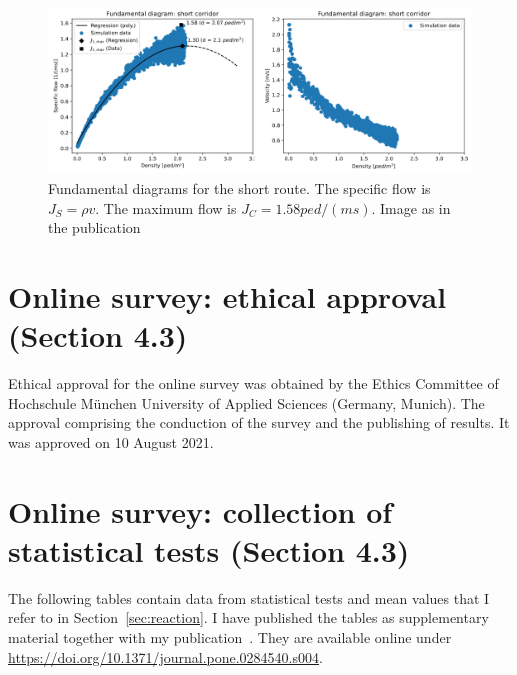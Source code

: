 \begin{figure}[hbt!]
\includegraphics[width=\textwidth]{../figures/appendix/capacityestimation.png} 
\caption[Fundamental diagrams for the short route]{Fundamental diagrams for the short route. The specific flow is $J_S=\rho v $. The maximum flow is $J_C=1.58 ped/(ms)$. Image as in the publication~\cite{mayr-2022-cdyn}}
\label{fig:capaestimateion}
\end{figure}


 



\chapter{Online survey: ethical approval (Section 4.3)}
\label{sec:ethicalapproval}

Ethical approval for the online survey was obtained by the Ethics Committee of Hochschule München University of Applied Sciences (Germany, Munich). The approval comprising the conduction of the survey and the publishing of results. It was approved on 10 August 2021.






\chapter{Online survey: collection of statistical tests (Section 4.3)}
\label{sec:collectiontables}
The following tables contain data from statistical tests and mean values that I refer to in Section~\ref{sec:reaction}. I have published the tables as supplementary material together with my publication~\cite{mayr-2023-cdyn}. They are available online under \url{https://doi.org/10.1371/journal.pone.0284540.s004}.


